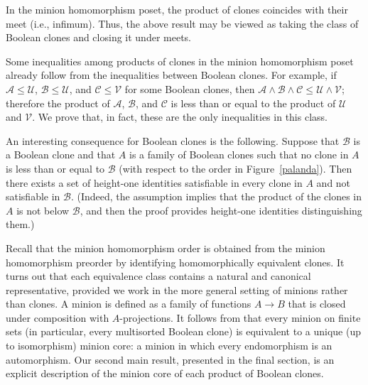 \documentclass{amsart}
\numberwithin{equation}{section}
\theoremstyle{plain}
\theoremstyle{definition}
\def\clone#1{\mathcal{#1}}
\begin{document}
In the minion homomorphism poset, the product of clones coincides with their meet (i.e., infimum). Thus, the above result may be viewed as taking the class of Boolean clones and closing it under meets.
    
    Some inequalities among products of clones in the minion homomorphism poset already follow from the inequalities between Boolean clones. For example, if  $\clone{A} \le \clone{U}$, $\clone{B} \le \clone{U}$, and $\clone{C} \le \clone{V}$ for some Boolean clones, then $\clone{A} \wedge \clone{B} \wedge \clone{C} \le \clone{U} \wedge \clone{V}$; therefore the product of $\clone{A}$, $\clone{B}$, and $\clone{C}$ is less than or equal to the product of $\clone{U}$ and $\clone{V}$. We prove that, in fact, these are the only inequalities in this class.

An interesting consequence for Boolean clones is the following. 
Suppose that $\clone{B}$ is a Boolean clone and that $A$ is a family of Boolean clones such that no clone in $A$ is less than or equal to $\clone{B}$ (with respect to the order in Figure~\ref{palanda}). Then there exists a set of height-one identities satisfiable in every clone in $A$ and not satisfiable in $\clone{B}$. (Indeed, the assumption implies that the product of the clones in $A$ is not below $\clone{B}$, and then the proof provides height-one identities distinguishing them.)

Recall that
the minion homomorphism order is obtained from the minion homomorphism preorder by identifying homomorphically equivalent clones.
It turns out that each equivalence class contains a natural and canonical representative, provided we work in the more general setting of minions rather than clones. A minion is defined as a family of functions $A \to B$ that is closed under composition with $A$-projections. It follows from \cite{kapytka} that every minion on finite sets (in particular, every multisorted Boolean clone) is equivalent to a unique (up to isomorphism) minion core: a minion in which every endomorphism is an automorphism. 
Our second main result, presented in the final section, is an explicit description of the minion core of each product of Boolean clones.
\end{document}
